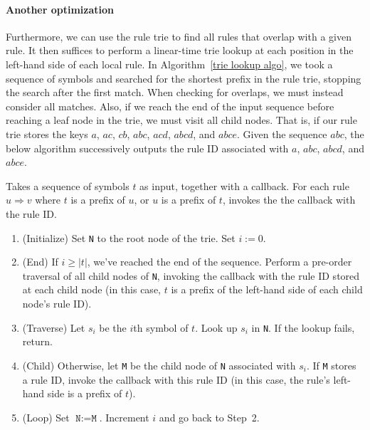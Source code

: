 \documentclass[../generics]{subfiles}
\begin{document}
\paragraph{Another optimization} Furthermore, we can use the rule trie to find all rules that overlap with a given rule. It then suffices to perform a linear-time trie lookup at each position in the left-hand side of each local rule. In Algorithm~\ref{trie lookup algo}, we took a sequence of symbols and searched for the shortest prefix in the rule trie, stopping the search after the first match. When checking for overlaps, we must instead consider all matches. Also, if we reach the end of the input sequence before reaching a leaf node in the trie, we must visit all child nodes. That is, if our rule trie stores the keys $a$, $ac$, $cb$, $abc$, $acd$, $abcd$, and $abce$. Given the sequence $abc$, the below algorithm successively outputs the rule ID associated with $a$, $abc$, $abcd$, and $abce$.

\begin{algorithm}\label{overlap trie lookup}
Takes a sequence of symbols $t$ as input, together with a callback. For each rule $u\Rightarrow v$ where $t$ is a prefix of $u$, or $u$ is a prefix of $t$, invokes the the callback with the rule ID.
\begin{enumerate}
\item (Initialize) Set \texttt{N} to the root node of the trie. Set $i:=0$.
\item (End) If $i\geq|t|$, we've reached the end of the sequence. Perform a pre-order traversal of all child nodes of \texttt{N}, invoking the callback with the rule ID stored at each child node (in this case, $t$ is a prefix of the left-hand side of each child node's rule ID).
\item (Traverse) Let $s_i$ be the $i$th symbol of $t$. Look up $s_i$ in \texttt{N}. If the lookup fails, return.
\item (Child) Otherwise, let \texttt{M} be the child node of \texttt{N} associated with $s_i$. If \texttt{M} stores a rule ID, invoke the callback with this rule ID (in this case, the rule's left-hand side is a prefix of $t$).
\item (Loop) Set $\texttt{N}:=\texttt{M}$. Increment $i$ and go back to Step~2.
\end{enumerate}
\end{algorithm}

\begin{algorithm}\label{critical pair algo}

\end{algorithm}
\end{document}
